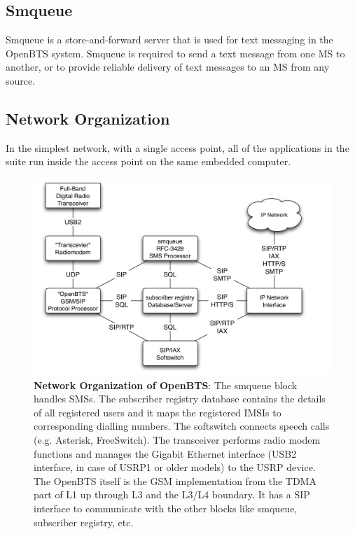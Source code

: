 \subsection{Smqueue}
Smqueue is a store-and-forward server that is used for text messaging in the OpenBTS system. Smqueue is required to send a text message from one MS to another, or to provide reliable delivery of text messages to an MS from any source.

\subsection{Network Organization}
In the simplest network, with a single access point, all of the applications in the suite run inside the access point on the same embedded computer.



\begin{figure}[h]
\centering
\includegraphics[width=1\textwidth]{networkOrg}
\caption{\textbf{Network Organization of OpenBTS}: The smqueue block handles SMSs. 
The subscriber registry database contains the details of all registered users and it
maps the registered IMSIs to corresponding dialling numbers. The softswitch connects 
speech calls (e.g. Asterisk, FreeSwitch). The transceiver performs radio modem
functions and manages the Gigabit Ethernet interface (USB2 interface, in case
of USRP1 or older models) to the USRP device. The OpenBTS itself is the GSM 
implementation from the TDMA part of L1 up through L3 and the L3/L4 boundary. 
It has a SIP interface to communicate with the other blocks like smqueue, subscriber 
registry, etc.
}
\label{networkOrg}
\end{figure}





















